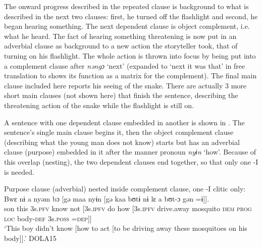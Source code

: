 \documentclass[output=paper]{langscibook}
\begin{document}
\noindent The onward progress described in the repeated clause is background to what is described in the next two clauses: first, he turned off the flashlight and second, he began hearing something. The next dependent clause is object complement, i.e. what he heard. The fact of hearing something threatening is now put in an adverbial clause as background to a new action the storyteller took, that of turning on his flashlight. The whole action is thrown into focus by being put into a complement clause after \textit{nəngɔ} `next' (expanded to `next it was that' in free translation to shows its function as a matrix for the complement). The final main clause included here reports his seeing of the snake. There are actually 3 more short main clauses (not shown here) that finish the sentence, describing the threatening action of the snake while the flashlight is still on.

A sentence with one dependent clause embedded in another is shown in . The sentence's single main clause begins it, then the object complement clause (describing what the young man does not know) starts but has an adverbial clause (purpose) embedded in it after the manner pronoun \textit{nyɨn} `how'. Because of this overlap (nesting), the two dependent clauses end together, so that only one -I is needed.

\ea Purpose clause (adverbial) nested inside complement clause, one -I clitic only:
\label{ex:dettweiler:DOLA15} \\
\gll Bwɛ nɨ a nyəm bɔ [gə maa nyɨn [gə kaa bʊtɨ nɨ lɛ a bʊt-ɔ gən =ɨ]]. \\
son this 3s.\textsc{pfv} know not [3s.\textsc{ipfv} do how [3s.\textsc{ipfv} drive.away mosquito \textsc{dem} \textsc{prog} \textsc{loc} body-\textsc{def} 3s.\textsc{poss} =\textsc{dep}]] \\
\glt `This boy didn't know [how to act [to be driving away these mosquitoes on his body]].' DOLA15
\z
\end{document}
